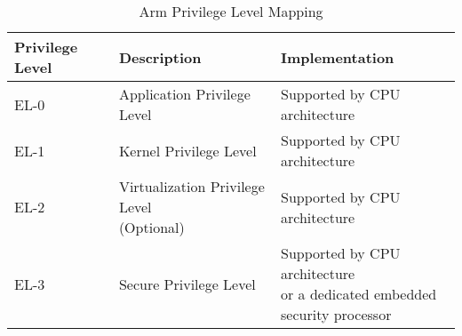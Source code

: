 \begin{table}[ht]
\centering
\begin{tabular}{|l|l|l|}
\hline
\textbf{Privilege Level} & \textbf{Description} & \textbf{Implementation}                                          \\ \hline
EL-0 & Application Privilege Level & Supported by CPU architecture                                                   \\ \hline
EL-1 & Kernel Privilege Level & Supported by CPU architecture                                                   \\ \hline
EL-2 & \makecell[l]{Virtualization Privilege Level \\ (Optional)} & Supported by CPU architecture                                                   \\ \hline
EL-3 & Secure Privilege Level & \makecell[l]{Supported by CPU architecture \\ or a dedicated embedded \\ security processor} \\ \hline
\end{tabular}
\caption{Arm Privilege Level Mapping}
\label{table:arm_priv_lev_map}
\end{table}
